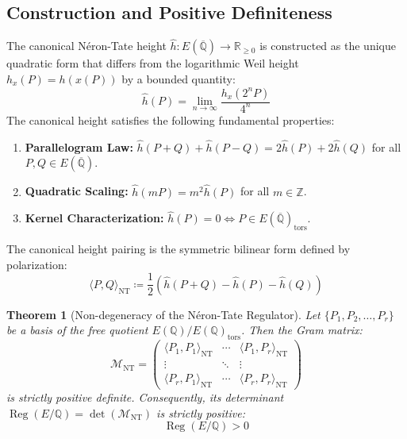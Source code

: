 \documentclass[11pt,a4paper]{article}
\newtheorem{theorem}{Theorem}[section]
\theoremstyle{definition}
\begin{document}
\subsection{Construction and Positive Definiteness}
The canonical Néron-Tate height $\hat{h} : E(\overline{\mathbb{Q}}) \to \mathbb{R}_{\ge 0}$ is constructed as the unique quadratic form that differs from the logarithmic Weil height $h_x(P) = h(x(P))$ by a bounded quantity:
\begin{equation}
\hat{h}(P) = \lim_{n \to \infty} \frac{h_x(2^n P)}{4^n}
\end{equation}
The canonical height satisfies the following fundamental properties:
\begin{enumerate}
    \item \textbf{Parallelogram Law:} $\hat{h}(P + Q) + \hat{h}(P - Q) = 2\hat{h}(P) + 2\hat{h}(Q)$ for all $P, Q \in E(\overline{\mathbb{Q}})$.
    \item \textbf{Quadratic Scaling:} $\hat{h}(mP) = m^2 \hat{h}(P)$ for all $m \in \mathbb{Z}$.
    \item \textbf{Kernel Characterization:} $\hat{h}(P) = 0 \iff P \in E(\overline{\mathbb{Q}})_{\mathrm{tors}}$.
\end{enumerate}

The canonical height pairing is the symmetric bilinear form defined by polarization:
\begin{equation}
\langle P, Q \rangle_{\mathrm{NT}} \coloneqq \frac{1}{2}\left( \hat{h}(P + Q) - \hat{h}(P) - \hat{h}(Q) \right)
\end{equation}

\begin{theorem}[Non-degeneracy of the Néron-Tate Regulator]
Let $\{P_1, P_2, \dots, P_r\}$ be a basis of the free quotient $E(\mathbb{Q})/E(\mathbb{Q})_{\mathrm{tors}}$. Then the Gram matrix:
\begin{equation}
\mathcal{M}_{\mathrm{NT}} = \begin{pmatrix}
\langle P_1, P_1 \rangle_{\mathrm{NT}} & \cdots & \langle P_1, P_r \rangle_{\mathrm{NT}} \\
\vdots & \ddots & \vdots \\
\langle P_r, P_1 \rangle_{\mathrm{NT}} & \cdots & \langle P_r, P_r \rangle_{\mathrm{NT}}
\end{pmatrix}
\end{equation}
is strictly positive definite. Consequently, its determinant $\operatorname{Reg}(E/\mathbb{Q}) = \det(\mathcal{M}_{\mathrm{NT}})$ is strictly positive:
\begin{equation}
\operatorname{Reg}(E/\mathbb{Q}) > 0
\end{equation}
\end{theorem}
\end{document}
